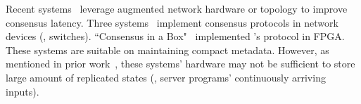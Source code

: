 % 
% 






  Recent
systems~\cite{consensusbox:nsdi16,netpaxos:sosr15,caans,specpaxos:nsdi15,
nopaxos:osdi16} leverage augmented network hardware or topology to 
improve \paxos consensus latency. 
Three systems~\cite{consensusbox:nsdi16,netpaxos:sosr15,caans} implement 
consensus protocols in network devices (\eg, switches). ``Consensus in a 
Box"~\cite{consensusbox:nsdi16} implemented \zookeeper's protocol in 
FPGA. These systems are suitable on maintaining compact metadata. However, 
as mentioned in prior work~\cite{nopaxos:osdi16}, these systems' hardware may 
not be sufficient to store large amount of replicated states (\eg, server 
programs' continuously arriving inputs).

